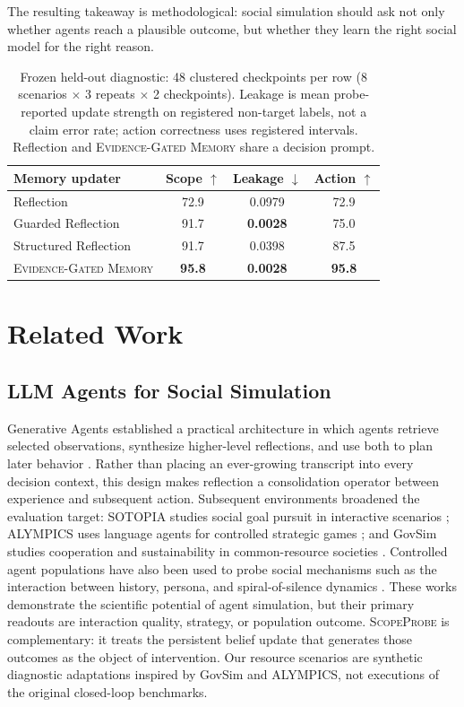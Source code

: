 \documentclass[sigconf,anonymous]{acmart}
\newcommand{\method}{\textsc{ScopeProbe}}
\newcommand{\egm}{\textsc{Evidence-Gated Memory}}
\begin{document}
The resulting takeaway is methodological: social simulation should ask not
only whether agents reach a plausible outcome, but whether they learn the
right social model for the right reason.

\begin{table}[t]
  \caption{Frozen held-out diagnostic: 48 clustered checkpoints per row
  (8 scenarios $\times$ 3 repeats $\times$ 2 checkpoints). Leakage is mean
  probe-reported update strength on registered non-target labels, not a claim
  error rate; action correctness uses registered intervals. Reflection and
  \egm{} share a decision prompt.}
  \label{tab:heldout}
  \centering
  \small
  \setlength{\tabcolsep}{3.4pt}
  \begin{tabular}{@{}lccc@{}}
    \toprule
    Memory updater & Scope $\uparrow$ & Leakage $\downarrow$ & Action $\uparrow$ \\
    \midrule
    Reflection            & 72.9 & 0.0979          & 72.9 \\
    Guarded Reflection    & 91.7 & \textbf{0.0028} & 75.0 \\
    Structured Reflection & 91.7 & 0.0398          & 87.5 \\
    \egm                  & \textbf{95.8} & \textbf{0.0028} & \textbf{95.8} \\
    \bottomrule
  \end{tabular}
\end{table}

\section{Related Work}

\subsection{LLM Agents for Social Simulation}

Generative Agents established a practical architecture in which agents retrieve
selected observations, synthesize higher-level reflections, and use both to
plan later behavior \cite{park2023generative}. Rather than placing an ever-growing
transcript into every decision context, this design makes reflection a
consolidation operator between experience and subsequent action.
Subsequent environments broadened the evaluation target: SOTOPIA studies social
goal pursuit in interactive scenarios \cite{zhou2024sotopia}; ALYMPICS uses
language agents for controlled strategic games \cite{mao2025alympics}; and
GovSim studies cooperation and sustainability in common-resource societies
\cite{piatti2024cooperate}. Controlled agent populations have also been used to
probe social mechanisms such as the interaction between history, persona, and
spiral-of-silence dynamics \cite{zhong2025spiral}. These works demonstrate the
scientific potential of agent simulation, but their primary readouts are
interaction quality, strategy, or population outcome. \method{} is
complementary: it treats the persistent belief update that generates those
outcomes as the object of intervention. Our resource scenarios are synthetic
diagnostic adaptations inspired by GovSim and ALYMPICS, not executions of the
original closed-loop benchmarks.
\end{document}
